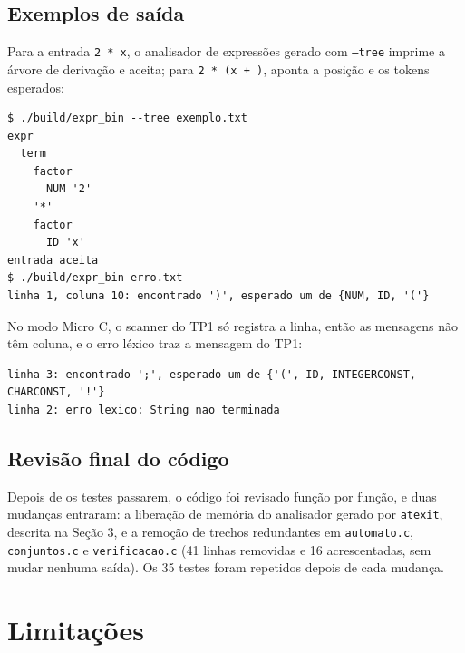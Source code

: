 \documentclass[11pt,a4paper]{article}
\begin{document}
\subsection{Exemplos de saída}

Para a entrada \texttt{2 * x}, o analisador de expressões gerado com \texttt{--tree} imprime a
árvore de derivação e aceita; para \texttt{2 * (x + )}, aponta a posição e os tokens esperados:

\begin{lstlisting}
$ ./build/expr_bin --tree exemplo.txt
expr
  term
    factor
      NUM '2'
    '*'
    factor
      ID 'x'
entrada aceita
$ ./build/expr_bin erro.txt
linha 1, coluna 10: encontrado ')', esperado um de {NUM, ID, '('}
\end{lstlisting}

\noindent No modo Micro C, o scanner do TP1 só registra a linha, então as mensagens não têm
coluna, e o erro léxico traz a mensagem do TP1:

\begin{lstlisting}
linha 3: encontrado ';', esperado um de {'(', ID, INTEGERCONST, CHARCONST, '!'}
linha 2: erro lexico: String nao terminada
\end{lstlisting}

\subsection{Revisão final do código}

Depois de os testes passarem, o código foi revisado função por função, e duas mudanças entraram:
a liberação de memória do analisador gerado por \texttt{atexit}, descrita na Seção 3, e a
remoção de trechos redundantes em \texttt{automato.c}, \texttt{conjuntos.c} e
\texttt{verificacao.c} (41 linhas removidas e 16 acrescentadas, sem mudar nenhuma saída). Os 35
testes foram repetidos depois de cada mudança.

\section{Limitações}
\end{document}
